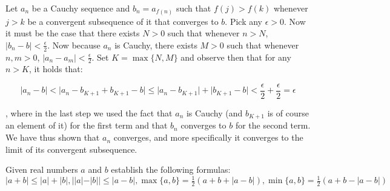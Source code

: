 \begin{solution}

    Let $a_n$ be a Cauchy sequence and $b_n = a_{f(n)}$ such that $f(j) > f(k)$ whenever $j > k$ be a convergent subsequence of it that converges to $b$. Pick any $\epsilon > 0$. Now it must be the case that there exists $N>0$ such that whenever $n > N$, $\lvert b_n - b \rvert < \frac{\epsilon}{2}$. Now because $a_n$ is Cauchy, there exists $ M > 0$ such that whenever $n, m > 0$, $\lvert a_n - a_m \rvert < \frac{\epsilon}{2}$. Set $K = \max\{N, M\}$ and observe then that for any $n > K$, it holds that:

    $$\lvert a_n - b \rvert < \lvert a_n - b_{K+1} + b_{K+1} -b\rvert \leq \lvert a_n - b_{K+1} \rvert + \lvert b_{K+1} - b \rvert < \frac{\epsilon}{2} + \frac{\epsilon}{2} = \epsilon$$

    , where in the last step we used the fact that $a_n$ is Cauchy (and $b_{K+1}$ is of course an element of it) for the first term and that $b_n$ converges to $b$ for the second term. We have thus shown that $a_n$ converges, and more specifically it converges to the limit of its convergent subsequence.
\end{solution}

\begin{exercise}{17}
    Given real numbers $a$ and $b$ establish the following formulas: $\lvert a + b \rvert \leq \lvert a \rvert + \lvert b \rvert, \bigl\lvert \lvert a \lvert - \lvert b \rvert \bigr\rvert \leq \lvert a - b \rvert, \max\{a, b\} = \frac{1}{2}(a + b + \lvert a - b \rvert), \min\{a, b\} = \frac{1}{2}(a+b - \lvert a - b \rvert)$
\end{exercise}

